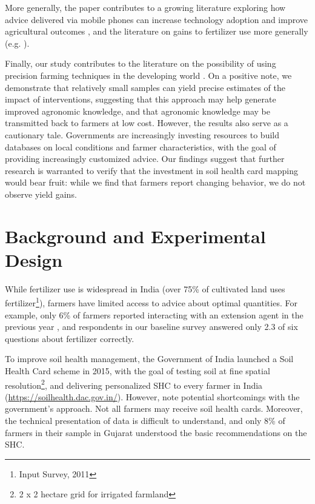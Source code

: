 \documentclass{article}
\begin{document}
More generally, the paper contributes to a growing literature exploring how advice delivered via mobile phones can increase technology adoption and improve agricultural outcomes \citep{Casaburi2019HarnessingKenya,Fabregas2019SMS-extensionAfrica,Cole2020MobileizingSustainability}, and the literature on gains to fertilizer use more generally (e.g. \citet{Beaman2013ProfitabilityMali}). 

Finally, our study contributes to the literature on the possibility of using precision farming techniques in the developing world \citep{Mondal2009AdoptionStrategies,Maohua2001PossibleMillennium}. On a positive note, we demonstrate that relatively small samples can yield precise estimates of the impact of interventions, suggesting that this approach may help generate improved agronomic knowledge, and that agronomic knowledge may be transmitted back to farmers at low cost. However, the results also serve as a cautionary tale. Governments are increasingly investing resources to build databases on local conditions and farmer characteristics, with the goal of providing increasingly customized advice. Our findings suggest that further research is warranted to verify that the investment in soil health card mapping would bear fruit: while we find that farmers report changing behavior, we do not observe yield gains.  

\section{Background and Experimental Design}

While fertilizer use is widespread in India (over 75\% of cultivated land uses fertilizer\footnote{Input Survey, 2011}), farmers have limited access to advice about optimal quantities. For example, only 6\% of farmers reported interacting with an extension agent in the previous year \citep{Cole2017TheAgriculture}, and respondents in our baseline survey answered only 2.3 of six questions about fertilizer correctly.

To improve soil health management, the Government of India launched a Soil Health Card scheme in 2015, with the goal of testing soil at fine spatial resolution\footnote{2 x 2 hectare grid for irrigated farmland}, and delivering personalized SHC to every farmer in India (\url{https://soilhealth.dac.gov.in/}). However, \citet{Cole2017TheAgriculture} note potential shortcomings with the government's approach. Not all farmers may receive soil health cards. Moreover, the technical presentation of data is difficult to understand, and only 8\% of farmers in their sample in Gujarat understood the basic recommendations on the SHC. 
\end{document}
